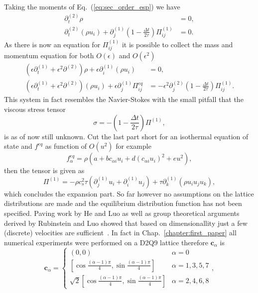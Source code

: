 Taking the moments of Eq.~(\ref{eq:sec_order_esp}) we have
\begin{align}
    \partial_t^{(2)}\rho &= 0, \\
    \partial_t^{(2)}(\rho u_i) + \partial^{(1)}_j\left(1 - \frac{\Delta t}{2\tau}\right)\Pi_{i j}^{(1)} &= 0.
\end{align}
As there is now an equation for $\Pi^{(1)}_{i j}$ it is possible to collect the mass and momentum equation for both $O(\epsilon)$ and $O(\epsilon^2)$
\begin{align}
    (\epsilon\partial_t^{(1)} + \epsilon^2\partial^{(2)})\rho + \epsilon\partial_i^{(1)}(\rho u_i) &= 0, \\
    (\epsilon\partial_t^{(1)} + \epsilon^2\partial^{(2)})(\rho u_i) + \epsilon\partial_j^{(1)}\Pi^{eq}_{i j} &= -\epsilon^2\partial_j^{(2)}\left(1 - \frac{\Delta t}{2\tau}\right) \Pi^{(1)}_{i j}. 
\end{align}
This system in fact resembles the Navier-Stokes with the small pitfall that the viscous stress tensor
\begin{equation}
    \sigma = - \left(1 - \frac{\Delta t}{2\tau}\right) \Pi^{(1)},
\end{equation}
is as of now still unknown.
Cut the last part short for an isothermal equation of state and $f^{eq}$ as function of $O(u^2)$ for example
\begin{equation}\label{eq:eqi_dist1}
    f_{\alpha}^{eq} = \rho(a + b c_{\alpha i} u_i + d (c_{\alpha i} u_i)^2 + e u^2),
\end{equation}
then the tensor is given as
\begin{equation}
    \Pi^{(1)} = -\rho c_s^2\tau(\partial_j^{(1)}u_i + \partial_i^{(1)}u_j) + \tau\partial_k^{(1)}(\rho u_i u_j u_k),
\end{equation}
which concludes the expansion part.
So far however no assumptions on the lattice distributions are made and the equilibrium distribution function has not been specified.
Paving work by He and Luo as well as group theoretical arguments derived by Rubinstein and Luo showed that based on dimensionallity just a few (discrete) velocities are sufficient~\cite{PhysRevE.56.6811, rubinstein2008theory}.
In fact in Chap.~\ref{chapter:first_paper} all numerical experiments were performed on a D2Q9 lattice therefore $\mathbf{c}_{\alpha}$ is
\begin{equation}\label{eq:speeds_method}
\mathbf{c}_{\alpha}  =
\left\{
\begin{array}{ll}
(0,0) & \alpha = 0 \\
\left[\cos{\frac{(\alpha-1)\pi}{4}}, \sin{\frac{(\alpha-1)\pi}{4}} \right] &  \alpha=1,3,5,7 \\
\sqrt{2}\left[\cos{\frac{(\alpha-1)\pi}{4}}, \sin{\frac{(\alpha-1)\pi}{4}} \right] & \alpha=2,4,6,8
\end{array}
\right.,
\end{equation}

